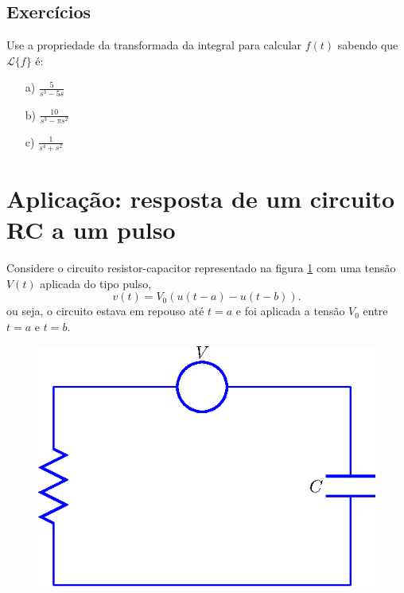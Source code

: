 \subsection*{Exercícios}
\begin{exer}
Use a propriedade da transformada da integral para calcular $f(t)$ sabendo que $\mathcal{L}\{f \} $ é:
\begin{itemize}
  \item[a)] $\displaystyle \frac{5}{s^3 - 5s}$
  \item[b)] $\displaystyle \frac{10}{s^3 - \pi s^2}$
  \item[c)] $\displaystyle \frac{1}{s^4 + s^2}$
\end{itemize}
\end{exer}

\section{Aplicação: resposta de um circuito RC a um pulso}{\label{sec_circ}}
Considere o circuito resistor-capacitor representado na figura \ref{fig_circ} com uma tensão $V(t)$ aplicada do tipo pulso,
\begin{equation}
v(t)=V_0\left(u(t-a)-u(t-b)\right).
\end{equation}
ou seja, o circuito estava em repouso até $t=a$ e foi aplicada a tensão $V_0$ entre $t=a$ e $t=b$.
\begin{figure}[!ht]
\begin{center}

\includegraphics{cap_trans_int/pics/figura_10}\end{center}
\caption{\label{fig_circ}}
\end{figure}
